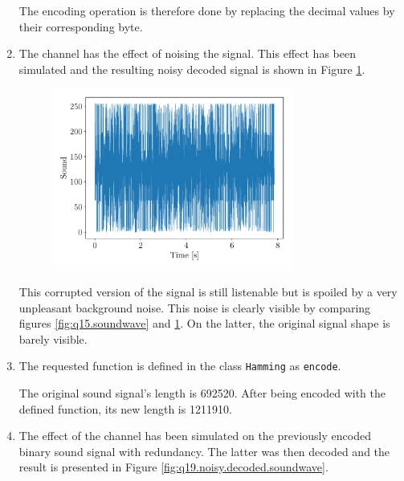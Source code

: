 \documentclass[a4paper, 12pt]{article}
\begin{document}
\begin{enumerate}[leftmargin=*]
        The encoding operation is therefore done by replacing the decimal values by their corresponding byte.
        
        
        \item The channel has the effect of noising the signal. This effect has been simulated and the resulting noisy decoded signal is shown in Figure \ref{fig:q17.noisy.soundwave}.
        
        \begin{figure}[H]
            \centering
            \includegraphics[width=0.75\textwidth]{resources/pdf/noisy_soundwave.pdf}
            \label{fig:q17.noisy.soundwave}
        \end{figure}
        
        This corrupted version of the signal is still listenable but is spoiled by a very unpleasant background noise. This noise is clearly visible by comparing figures \ref{fig:q15.soundwave} and \ref{fig:q17.noisy.soundwave}. On the latter, the original signal shape is barely visible.
        
        
        \item The requested function is defined in the class \texttt{Hamming} as \texttt{encode}.
        
        The original sound signal's length is \num{692520}. After being encoded with the defined function, its new length is \num{1211910}.
        
        
        \item The effect of the channel has been simulated on the previously encoded binary sound signal with redundancy. The latter was then decoded and the result is presented in Figure \ref{fig:q19.noisy.decoded.soundwave}.
        

\end{enumerate}
\end{document}
